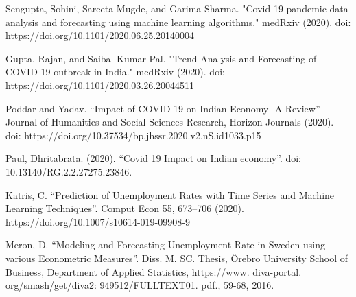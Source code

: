 \documentclass[10pt,journal,compsoc]{IEEEtran}
\begin{document}


%
%
%
\begin{thebibliography}{1}

Sengupta, Sohini, Sareeta Mugde, and Garima Sharma. "Covid-19 pandemic data analysis and forecasting using machine learning algorithms." medRxiv (2020). doi: https://doi.org/10.1101/2020.06.25.20140004

Gupta, Rajan, and Saibal Kumar Pal. "Trend Analysis and Forecasting of COVID-19 outbreak in India." medRxiv (2020). doi: https://doi.org/10.1101/2020.03.26.20044511

Poddar and Yadav. “Impact of COVID-19 on Indian Economy- A Review” Journal of Humanities and Social Sciences Research, Horizon Journals (2020). doi: https://doi.org/10.37534/bp.jhssr.2020.v2.nS.id1033.p15

Paul, Dhritabrata. (2020). “Covid 19 Impact on Indian economy”. doi: 10.13140/RG.2.2.27275.23846.

Katris, C. “Prediction of Unemployment Rates with Time Series and Machine Learning Techniques”. Comput Econ 55, 673–706 (2020). https://doi.org/10.1007/s10614-019-09908-9

Meron, D. “Modeling and Forecasting Unemployment Rate in Sweden using various Econometric Measures”. Diss. M. SC. Thesis, Örebro University School of Business, Department of Applied Statistics, https://www. diva-portal. org/smash/get/diva2: 949512/FULLTEXT01. pdf., 59-68, 2016.

\end{thebibliography}
\end{document}
